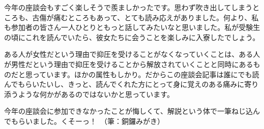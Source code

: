 今年の座談会もすごく楽しそうで羨ましかったです。思わず吹き出してしまうところも、古傷が痛むところもあって、とても読み応えがありました。何より、私も参加者の皆さん一人ひとりともっと話してみたいなと思いました。私が受験生の頃にこれを読んでいたら、彼女たちに会うことを楽しみに入寮したでしょう。

ある人が女性だという理由で抑圧を受けることがなくなっていくことは、ある人が男性だという理由で抑圧を受けることから解放されていくことと同時にあるものだと思っています。ほかの属性もしかり。だからこの座談会記事は誰にでも読んでもらいたいし、きっと、読んでくれた方にとって身に覚えのある痛みに寄り添うような何かがあるのではないかと思っています。

今年の座談会に参加できなかったことが悔しくて、解説という体で一筆ねじ込んでもらいました。くそーっ！　（筆：銅鑼みがき）







